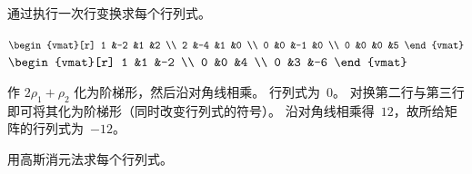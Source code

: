 \begin{exercises}
  \item[{\em 做这些题时，假设 $\nbyn{n}$ 行列式
      函数对一切 $n$ 都存在。}]
  \recommended \item 通过执行一次行变换求每个行列式。
    \begin{exparts*}
      \partsitem \( \begin{vmat}[r]
                 1  &-2  &1  &2 \\
                 2  &-4  &1  &0 \\
                 0  &0  &-1  &0 \\
                 0  &0  &0  &5
               \end{vmat} \)
      \partsitem \( \begin{vmat}[r]
                 1  &1  &-2  \\
                 0  &0  &4  \\
                 0  &3  &-6
               \end{vmat} \)
    \end{exparts*}
    \begin{answer}
      \begin{exparts}
       \partsitem 作 $2\rho_1+\rho_2$ 化为阶梯形，然后沿对角线相乘。
          行列式为~$0$。
        \partsitem 对换第二行与第三行即可将其化为阶梯形（同时改变行列式的符号）。
          沿对角线相乘得~$12$，故所给矩阵的行列式为~$-12$。
      \end{exparts}
    \end{answer}
  \recommended \item 
    用高斯消元法求每个行列式。
\end{exercises}
